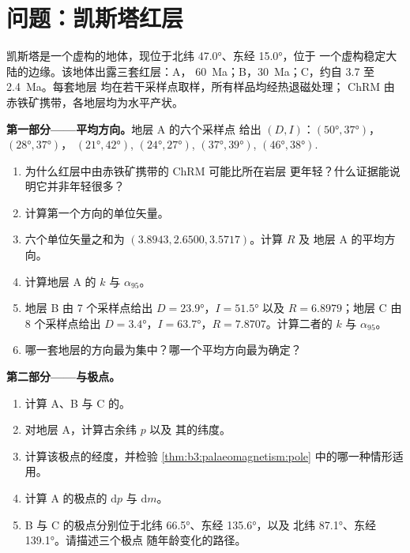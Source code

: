 \section{问题：凯斯塔红层}

\begin{problem}
\label{pb:b3:palaeomagnetism:1}
凯斯塔是一个虚构的地体，现位于北纬 \ang{47.0}、东经 \ang{15.0}，位于
一个虚构稳定大陆的边缘。该地体出露三套红层：A，
\qty{60}{Ma}；B，\qty{30}{Ma}；C，约自 3.7 至 \qty{2.4}{Ma}。每套地层
均在若干采样点取样，所有样品均经热退磁处理；
 ChRM 由赤铁矿携带，各地层均为水平产状。

\medskip\noindent\textbf{第一部分——平均方向。}地层 A 的六个采样点
给出 $(D, I)$：$(\ang{50}, \ang{37})$，$(\ang{28}, \ang{37})$，
$(\ang{21}, \ang{42})$, $(\ang{24}, \ang{27})$, $(\ang{37}, \ang{39})$,
$(\ang{46}, \ang{38})$.
\begin{enumerate}
  \item 为什么红层中由赤铁矿携带的 ChRM 可能比所在岩层
        更年轻？什么证据能说明它并非年轻很多？
  \item 计算第一个方向的单位矢量。
  \item 六个单位矢量之和为 $(3.8943, 2.6500, 3.5717)$。计算 $R$ 及
        地层 A 的平均方向。
  \item 计算地层 A 的 $k$ 与 $\alpha_{95}$。
  \item 地层 B 由 7 个采样点给出 $D = \ang{23.9}$，$I = \ang{51.5}$ 以及
        $R = 6.8979$；地层 C 由 8 个采样点给出 $D = \ang{3.4}$，$I =
        \ang{63.7}$，$R = 7.8707$。计算二者的 $k$ 与 $\alpha_{95}$。
  \item 哪一套地层的方向最为集中？哪一个平均方向最为确定？
\end{enumerate}

\medskip\noindent\textbf{第二部分——与极点。}
\begin{enumerate}[resume]
  \item 计算 A、B 与 C 的。
  \item 对地层 A，计算古余纬 $p$ 以及
        其的纬度。
  \item 计算该极点的经度，并检验
        \cref{thm:b3:palaeomagnetism:pole} 中的哪一种情形适用。
  \item 计算 A 的极点的 $\mathrm dp$ 与 $\mathrm dm$。
  \item B 与 C 的极点分别位于北纬 \ang{66.5}、东经 \ang{135.6}，以及
        北纬 \ang{87.1}、东经 \ang{139.1}。请描述三个极点
        随年龄变化的路径。
\end{enumerate}


\end{problem}
